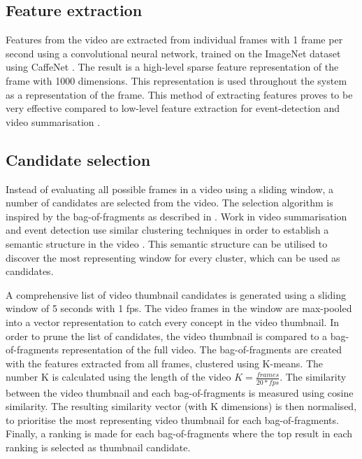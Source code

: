 \documentclass{../resources/sig-alternate-05-2015}
\begin{document}
\subsection{Feature extraction}
\label{feature extraction}
Features from the video are extracted from individual frames with 1 frame per second using a convolutional neural network, trained on the ImageNet dataset \cite{Krizhevsky:2012wl} using CaffeNet \cite{Jia:2014cm}. The result is a high-level sparse feature representation of the frame with 1000 dimensions. This representation is used throughout the system as a representation of the frame. This method of extracting features proves to be very effective compared to low-level feature extraction for event-detection \cite{Habibian:2013ks,Althoff:2012gf,Jiang:2012fy} and video summarisation \cite{Ajmal:2012hi,Mazloom:2015el}.

\subsection{Candidate selection}
\label{candidate selection}

Instead of evaluating all possible frames in a video using a sliding window, a number of candidates are selected from the video. The selection algorithm is inspired by the bag-of-fragments as described in \cite{Mettes:2015vg}. Work in video summarisation and event detection use similar clustering techniques in order to establish a semantic structure in the video \cite{Yuan:2011fu,Habibian:2014dc}. This semantic structure can be utilised to discover the most representing window for every cluster, which can be used as candidates.

A comprehensive list of video thumbnail candidates is generated using a sliding window of 5 seconds with 1 fps. The video frames in the window are max-pooled into a vector representation to catch every concept in the video thumbnail. In order to prune the list of candidates, the video thumbnail is compared to a bag-of-fragments representation of the full video. The bag-of-fragments are created with the features extracted from all frames, clustered using K-means. The number K is calculated using the length of the video $K = \frac{frames}{20 * fps}$. The similarity between the video thumbnail and each bag-of-fragments is measured using cosine similarity. The resulting similarity vector (with K dimensions) is then normalised, to prioritise the most representing video thumbnail for each bag-of-fragments. Finally, a ranking is made for each bag-of-fragments where the top result in each ranking is selected as thumbnail candidate.
\end{document}
